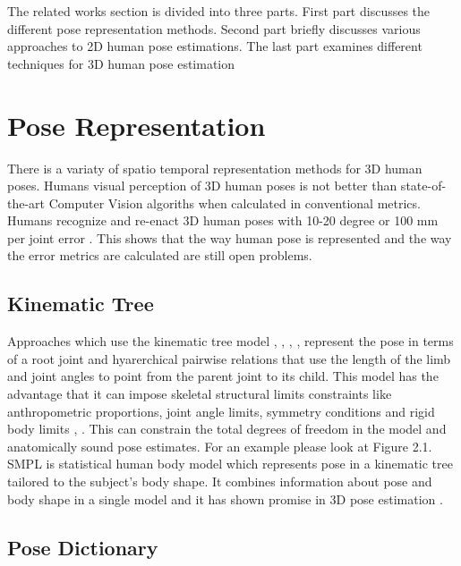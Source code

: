 The related works section is divided into three parts. First part discusses the different pose representation methods. Second part briefly discusses various approaches to 2D human pose estimations. The last part examines different techniques for 3D human pose estimation 

\section{Pose Representation}

There is a variaty of spatio temporal representation methods for 3D human poses. Humans visual perception of 3D human poses is not better than state-of-the-art Computer Vision algoriths when calculated in conventional metrics. Humans recognize and re-enact 3D human poses with 10-20 degree or 100 mm per joint error \parencite{marinoiu2013pictorial}. This shows that the way human pose is represented and the way the error metrics are calculated are still open problems.

\subsection{Kinematic Tree}

Approaches which use the kinematic tree model \parencite{barron2001estimating}, \parencite{wei2009modeling}, \parencite{zhou2016deep}, \parencite{sun2017compositional}, \parencite{mehta2017monocular} represent the pose in terms of a root joint and hyarerchical pairwise relations that use the length of the limb and joint angles to point from the parent joint to its child. This model has the advantage that it can impose  skeletal structural limits constraints like anthropometric proportions, joint angle limits, symmetry conditions and rigid body limits \parencite{dabral2017structure}, \parencite{wei2009modeling}. This can constrain the total degrees of freedom in the model and anatomically sound pose estimates. For an example please look at Figure 2.1. SMPL \parencite{loper2015smpl} is statistical human body model which represents pose in a kinematic tree tailored to the subject’s body shape. It combines information about pose and body shape in a single model and it has shown promise in 3D pose estimation \parencite{bogo2016keep}.

\subsection{Pose Dictionary}

